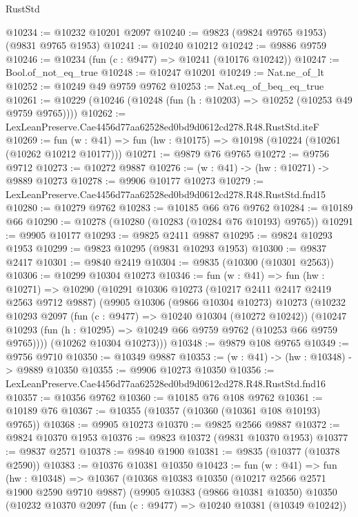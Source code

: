 \begin{lexlean}{RustStd}
\begin{coremodule}
@10234 := @10232 @10201 @2097
@10240 := @9823 (@9824 @9765 @1953) (@9831 @9765 @1953)
@10241 := @10240 @10212
@10242 := @9886 @9759
@10246 := @10234 (fun (c : @9477) => @10241 (@10176 @10242))
@10247 := Bool.of_not_eq_true
@10248 := @10247 @10201
@10249 := Nat.ne_of_lt
@10252 := @10249 @49 @9759 @9762
@10253 := Nat.eq_of_beq_eq_true
@10261 := @10229 (@10246 (@10248 (fun (h : @10203) => @10252 (@10253 @49 @9759 @9765))))
@10262 := LexLeanPreserve.Cae4456d77aa62528ed0bd9d0612cd278.R48.RustStd.iteF
@10269 := fun (w : @41) => fun (hw : @10175) => @10198 (@10224 (@10261 (@10262 @10212 @10177)))
@10271 := @9879 @76 @9765
@10272 := @9756 @9712
@10273 := @10272 @9887
@10276 := (w : @41) -> (hw : @10271) -> @9889 @10273
@10278 := @9906 @10177 @10273
@10279 := LexLeanPreserve.Cae4456d77aa62528ed0bd9d0612cd278.R48.RustStd.fnd15
@10280 := @10279 @9762
@10283 := @10185 @66 @76 @9762
@10284 := @10189 @66
@10290 := @10278 (@10280 (@10283 (@10284 @76 @10193) @9765))
@10291 := @9905 @10177
@10293 := @9825 @2411 @9887
@10295 := @9824 @10293 @1953
@10299 := @9823 @10295 (@9831 @10293 @1953)
@10300 := @9837 @2417
@10301 := @9840 @2419
@10304 := @9835 (@10300 (@10301 @2563))
@10306 := @10299 @10304 @10273
@10346 := fun (w : @41) =>
  fun (hw : @10271) =>
  @10290
    (@10291
      @10306
      @10273
      (@10217 @2411 @2417 @2419 @2563 @9712 @9887)
      (@9905
        @10306
        (@9866 @10304 @10273)
        @10273
        (@10232
          @10293
          @2097
          (fun (c : @9477) => @10240 @10304 (@10272 @10242))
          (@10247 @10293 (fun (h : @10295) => @10249 @66 @9759 @9762 (@10253 @66 @9759 @9765))))
        (@10262 @10304 @10273)))
@10348 := @9879 @108 @9765
@10349 := @9756 @9710
@10350 := @10349 @9887
@10353 := (w : @41) -> (hw : @10348) -> @9889 @10350
@10355 := @9906 @10273 @10350
@10356 := LexLeanPreserve.Cae4456d77aa62528ed0bd9d0612cd278.R48.RustStd.fnd16
@10357 := @10356 @9762
@10360 := @10185 @76 @108 @9762
@10361 := @10189 @76
@10367 := @10355 (@10357 (@10360 (@10361 @108 @10193) @9765))
@10368 := @9905 @10273
@10370 := @9825 @2566 @9887
@10372 := @9824 @10370 @1953
@10376 := @9823 @10372 (@9831 @10370 @1953)
@10377 := @9837 @2571
@10378 := @9840 @1900
@10381 := @9835 (@10377 (@10378 @2590))
@10383 := @10376 @10381 @10350
@10423 := fun (w : @41) =>
  fun (hw : @10348) =>
  @10367
    (@10368
      @10383
      @10350
      (@10217 @2566 @2571 @1900 @2590 @9710 @9887)
      (@9905
        @10383
        (@9866 @10381 @10350)
        @10350
        (@10232
          @10370
          @2097
          (fun (c : @9477) => @10240 @10381 (@10349 @10242))

\end{coremodule}
\end{lexlean}
